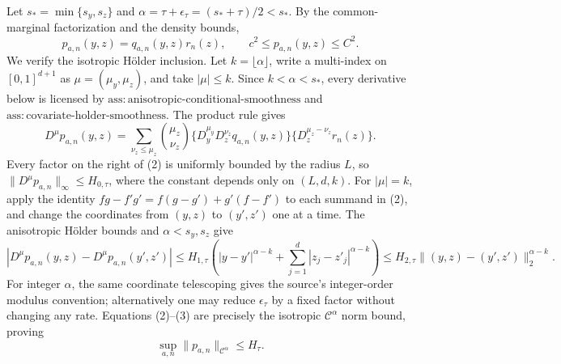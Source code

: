 Let \(s_*=\min\{s_y,s_z\}\) and \(\alpha=\tau+\epsilon_\tau=(s_*+\tau)/2<s_*\). By the common-marginal factorization and the density bounds,
\[
p_{a,n}(y,z)=q_{a,n}(y,z)r_n(z),
\qquad c^2\le p_{a,n}(y,z)\le C^2.                                 \tag{1}
\]
We verify the isotropic H\"older inclusion. Let \(k=\lfloor\alpha\rfloor\), write a multi-index on \([0,1]^{d+1}\) as \(\mu=(\mu_y,\mu_z)\), and take \(|\mu|\le k\). Since \(k<\alpha<s_*\), every derivative below is licensed by \(\mathrm{ass{:}anisotropic\text{-}conditional\text{-}smoothness}\) and \(\mathrm{ass{:}covariate\text{-}holder\text{-}smoothness}\). The product rule gives
\[
D^\mu p_{a,n}(y,z)
=\sum_{\nu_z\le\mu_z}{\mu_z\choose\nu_z}
\{D_y^{\mu_y}D_z^{\nu_z}q_{a,n}(y,z)\}
\{D_z^{\mu_z-\nu_z}r_n(z)\}.                                    \tag{2}
\]
Every factor on the right of (2) is uniformly bounded by the radius \(L\), so \(\|D^\mu p_{a,n}\|_\infty\le H_{0,\tau}\), where the constant depends only on \((L,d,k)\). For \(|\mu|=k\), apply the identity \(fg-f'g'=f(g-g')+g'(f-f')\) to each summand in (2), and change the coordinates from \((y,z)\) to \((y',z')\) one at a time. The anisotropic H\"older bounds and \(\alpha<s_y,s_z\) give
\[
|D^\mu p_{a,n}(y,z)-D^\mu p_{a,n}(y',z')|
\le H_{1,\tau}\left(|y-y'|^{\alpha-k}+\sum_{j=1}^d|z_j-z'_j|^{\alpha-k}\right)
\le H_{2,\tau}\|(y,z)-(y',z')\|_2^{\alpha-k}.                    \tag{3}
\]
For integer \(\alpha\), the same coordinate telescoping gives the source's integer-order modulus convention; alternatively one may reduce \(\epsilon_\tau\) by a fixed factor without changing any rate. Equations (2)--(3) are precisely the isotropic \(\mathcal C^\alpha\) norm bound, proving
\[
\sup_{a,n}\|p_{a,n}\|_{\mathcal C^\alpha}\le H_\tau.            \tag{4}
\]

